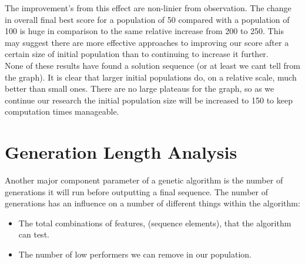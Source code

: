 The improvement's from this effect are non-linier from observation.
The change in overall final best score for a population of 50 compared with a population of 100 is huge in comparison to the same relative increase from 200 to 250.
This may suggest there are more effective approaches to improving our score after a certain size of initial population than to continuing to increase it further. \\



None of these results have found a solution sequence (or at least we cant tell from the graph).
It is clear that larger initial populations do, on a relative scale, much better than small ones.
There are no large plateaus for the graph, so as we continue our research the initial population size will be increased to 150 to keep computation times manageable.\\


\section{Generation Length Analysis}\label{sec:generationlengthanalysis}
Another major component parameter of a genetic algorithm is the number of generations it will run before outputting a final sequence.
The number of generations has an influence on a number of different things within the algorithm:

\begin{itemize}
    \item The total combinations of features, (sequence elements), that the algorithm can test.
    \item The number of low performers we can remove in our population.
\end{itemize}

